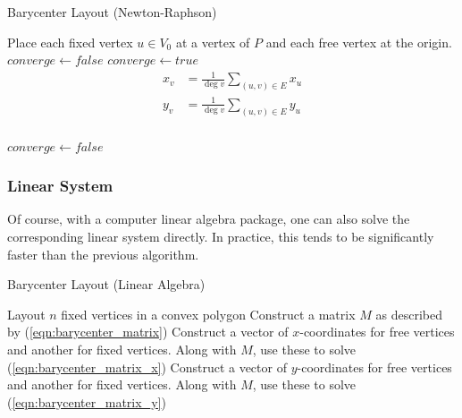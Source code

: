 \documentclass[11pt]{report}
\begin{document}
\begin{algorithm}[H]
    \caption{Barycenter Layout (Newton-Raphson)}
    \begin{algorithmic}[1]
        \State Place each fixed vertex $u \in V_0$ at a vertex of $P$ and each free vertex at the origin.
        \State $converge \gets false$
            \State $converge \gets true$
                \[
                \begin{aligned}
                x_v &= \frac{1}{\deg{v}} \sum_{(u, v) \in E} x_u \\
                y_v &= \frac{1}{\deg{v}} \sum_{(u, v) \in E} y_u \\
                \end{aligned}
                \]
                
                \State {}
                    \State $converge \gets false$
                \EndIf
            \EndFor
        \EndWhile
        \EndProcedure
    \end{algorithmic}
\end{algorithm}

\subsubsection{Linear System}
Of course, with a computer linear algebra package, one can also solve the corresponding linear system directly. In practice, this tends to be significantly faster than the previous algorithm.

\begin{algorithm}[H]
    \caption{Barycenter Layout (Linear Algebra)}\label{barycenter_la}
    \begin{algorithmic}[1]       
        \State Layout $n$ fixed vertices in a convex polygon
        \State Construct a matrix $M$ as described by (\ref{eqn:barycenter_matrix})
        \State Construct a vector of $x$-coordinates for free vertices and another for fixed vertices. Along with $M$, use these to solve (\ref{eqn:barycenter_matrix_x})
        \State Construct a vector of $y$-coordinates for free vertices and another for fixed vertices. Along with $M$, use these to solve (\ref{eqn:barycenter_matrix_y})
        \EndProcedure
    \end{algorithmic}
\end{algorithm}
\end{document}
